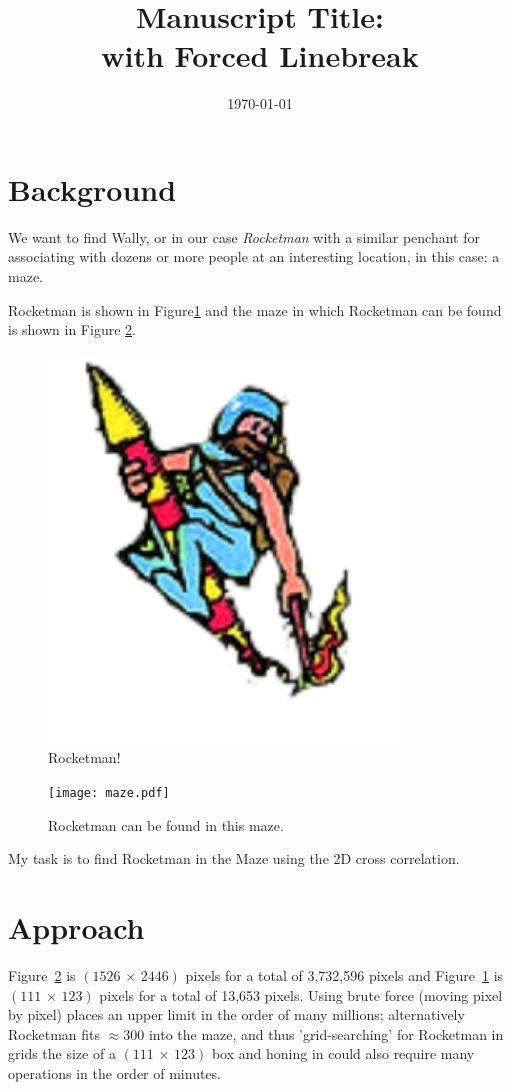 \documentclass[prb,11pt,twocolumn]{revtex4-1}
\begin{document}
\title{Manuscript Title:\\with Forced Linebreak}%
\date{\today}

\maketitle

\section{Background}
We want to find Wally, or in our case \textit{Rocketman} with a similar penchant for associating with dozens or more people at an interesting location, in this case: a maze.

Rocketman is shown in Figure\ref{fig:rocketman} and the maze in which Rocketman can be found is shown in Figure \ref{fig:maze}. 

\begin{figure}
    \includegraphics[]{rocketman.pdf}
    \caption{Rocketman!}
    \label{fig:rocketman}
\end{figure}

\begin{figure}
     \texttt{[image: maze.pdf]}
     \caption{Rocketman can be found in this maze.}
     \label{fig:maze}
\end{figure}

My task is to find Rocketman in the Maze using the 2D cross correlation.

\section{Approach}
Figure~\ref{fig:maze} is $(1526\,\times\,2446)$ pixels for a total of 3,732,596 pixels and Figure~\ref{fig:rocketman} is $(111\,\times\,123)$ pixels for a total of 13,653 pixels. Using brute force (moving pixel by pixel) places an upper limit in the order of many millions; alternatively Rocketman fits $\approx300$ into the maze, and thus 'grid-searching' for Rocketman in grids the size of a $(111\,\times\,123)$ box and honing in could also require many operations in the order of minutes.
\end{document}
